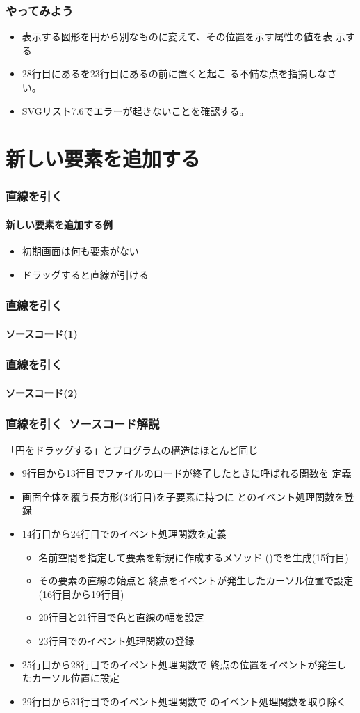 \begin{frame}
 \frametitle{やってみよう}
 \begin{itemize}
	\item 表示する図形を円から別なものに変えて、その位置を示す属性の値を表
				示する
	\item 28行目にあるを23行目にあるの前に置くと起こ
				る不備な点を指摘しなさい。
  \item SVGリスト7.6でエラーが起きないことを確認する。
 \end{itemize}
\end{frame}
 \section{新しい要素を追加する}
\begin{frame}[containsverbatim]
 \frametitle{直線を引く}
 \framesubtitle{新しい要素を追加する例}
 \begin{itemize}
  \item 初期画面は何も要素がない
  \item ドラッグすると直線が引ける
 \end{itemize}
 \end{frame}
\begin{frame}[containsverbatim]
 \frametitle{直線を引く}
 \framesubtitle{ソースコード(1)}
\end{frame}
\begin{frame}[containsverbatim]
 \frametitle{直線を引く}
 \framesubtitle{ソースコード(2)}
\end{frame}
\begin{frame}[containsverbatim]
 \frametitle{直線を引く--ソースコード解説}
 「円をドラッグする」とプログラムの構造はほとんど同じ
 \begin{itemize}
  \item 9行目から13行目でファイルのロードが終了したときに呼ばれる関数を
        定義
  \item 画面全体を覆う長方形(34行目)を子要素に持つに
           とのイベント処理関数を登録
  \item 14行目から24行目でのイベント処理関数を定義
    \begin{itemize}
     \item 名前空間を指定して要素を新規に作成するメソッド
           ()でを生成(15行目)
     \item その要素の直線の始点と
           終点をイベントが発生したカーソル位置で設定(16行目から19行目)
     \item 20行目と21行目で色と直線の幅を設定
     \item 23行目でのイベント処理関数の登録
    \end{itemize}
  \item 25行目から28行目でのイベント処理関数で
        終点の位置をイベントが発生したカーソル位置に設定
  \item 29行目から31行目でのイベント処理関数で
        のイベント処理関数を取り除く
 \end{itemize}
\end{frame}
